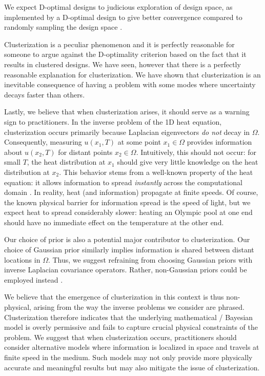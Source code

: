 We expect D-optimal designs to judicious exploration of
design space, as implemented by a D-optimal design to give better
convergence compared to randomly sampling the design
space \cite{knapik2011}.




Clusterization is a peculiar phenomenon and it is perfectly reasonable
for someone to argue against the D-optimality criterion based on the
fact that it results in clustered designs. We have seen, however that
there is a perfectly reasonable explanation for clusterization. We
have shown that clusterization is an inevitable consequence of having
a problem with some modes where uncertainty decays faster than others.

Lastly, we believe that when clusterization arises, it should serve as
a warning sign to practitioners. In the inverse problem of the 1D heat
equation, clusterization occurs primarily because Laplacian
eigenvectors \emph{do not} decay in $\Omega$. Consequently, measuring
$u(x_1, T)$ at some point $x_1 \in \Omega$ provides information about
$u(x_2,T)$ for distant points $x_2 \in \Omega$. Intuitively, this
should not occur: for small $T$, the heat distribution at $x_1$ should
give very little knowledge on the heat distribution at $x_2$. This
behavior stems from a well-known property of the heat equation: it
allows information to spread \emph{instantly} across the computational
domain \cite{renardy2006PDE}. In reality, heat (and information)
propagate at finite speeds. Of course, the known physical barrier for
information spread is the speed of light, but we expect heat to spread
considerably slower: heating an Olympic pool at one end should have no
immediate effect on the temperature at the other end.

Our choice of prior is also a potential major contributor to
clusterization. Our choice of Gaussian prior similarly implies
information is shared between distant locations in $\Omega$. Thus, we
suggest refraining from choosing Gaussian priors with inverse
Laplacian covariance operators. Rather, non-Gaussian priors could be
employed instead \cite{hosseini2017, hosseini2019}.

We believe that the emergence of clusterization in this context is
thus non-physical, arising from the way the inverse problems we
consider are phrased. Clusterization therefore indicates that the
underlying mathematical / Bayesian model is overly permissive and
fails to capture crucial physical constraints of the problem. We
suggest that when clusterization occurs, practitioners should consider
alternative models where information is localized in space and travels
at finite speed in the medium. Such models may not only provide more
physically accurate and meaningful results but may also mitigate the
issue of clusterization.
